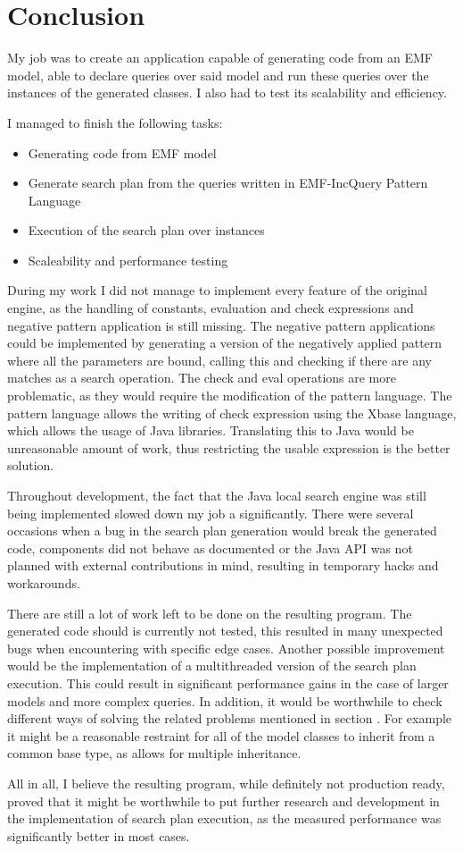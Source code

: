 \chapter{Conclusion}

My job was to create an application capable of generating code from an EMF
model, able to declare queries over said model and run these queries over the
\CPP{} instances of the generated classes. I also had to test its scalability
and efficiency.

I managed to finish the following tasks:

\begin{itemize}
  \item Generating code from EMF model
  \item Generate search plan from the queries written in EMF-IncQuery Pattern
  Language
  \item Execution of the search plan over \CPP{} instances
  \item Scaleability and performance testing
\end{itemize}

During my work I did not manage to implement every feature of the original
\EIQ{} engine, as the handling of constants, evaluation and check
expressions and negative pattern application is still missing. The negative
pattern applications could be implemented by generating a version of the
negatively applied pattern where all the parameters are bound, calling this and
checking if there are any matches as a search operation. The check and eval
operations are more problematic, as they would require the modification of the
pattern language. The \EIQ{} pattern language allows the writing of check
expression using the Xbase language, which allows the usage of Java libraries.
Translating this to Java would be unreasonable amount of work, thus restricting
the usable expression is the better solution.

Throughout development, the fact that the Java local search engine was
still being implemented slowed down my job a significantly. There were several
occasions when a bug in the search plan generation would break the \CPP{}
generated code, components did not behave as documented or the Java API was not
planned with external contributions in mind, resulting in temporary hacks and
workarounds.

There are still a lot of work left to be done on the resulting program. The
generated code should is currently not tested, this resulted in many unexpected
bugs when encountering with specific edge cases. Another possible improvement
would be the implementation of a multithreaded version of the search plan
execution. This could result in significant performance gains in the case of
larger models and more complex queries. In addition, it would be worthwhile to
check different ways of solving the \CPP{} related problems mentioned in section
. For example it might be a reasonable restraint
for all of the model classes to inherit from a common base type, as \CPP{}
allows for multiple inheritance.

All in all, I believe the resulting program, while definitely not production
ready, proved that it might be worthwhile to put further research and
development in the \CPP{} implementation of search plan execution, as the
measured performance was significantly better in most cases.

